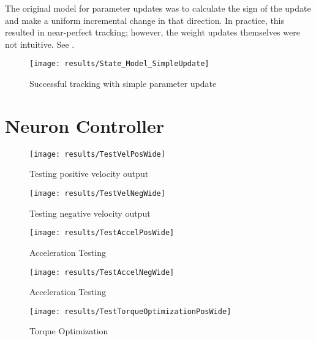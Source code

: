 
The original model for parameter updates was to calculate the sign of the update
and make a uniform incremental change in that direction. In practice, this 
resulted in near-perfect tracking; however, the weight updates themselves were
not intuitive. See .

\begin{figure}
\centering
\texttt{[image: results/State\_Model\_SimpleUpdate]}
\caption{Successful tracking with simple parameter update}
\label{fig:StateUpdateSimple}
\end{figure}

\section{Neuron Controller}




\begin{figure}
\centering
\texttt{[image: results/TestVelPosWide]}
\caption{Testing positive velocity output}
\label{fig:TestVelPos}
\end{figure}

\begin{figure}
\centering
\texttt{[image: results/TestVelNegWide]}
\caption{Testing negative velocity output}
\label{fig:TestVelNeg}
\end{figure}


\begin{figure}
\centering
\texttt{[image: results/TestAccelPosWide]}
\caption{Acceleration Testing}
\label{fig:TestAccelPos}
\end{figure}

\begin{figure}
\centering
\texttt{[image: results/TestAccelNegWide]}
\caption{Acceleration Testing}
\label{fig:TestAccelNeg}
\end{figure}

\begin{figure}
\centering
\texttt{[image: results/TestTorqueOptimizationPosWide]}
\caption{Torque Optimization}
\label{fig:TestTorqueOptimizationPos}
\end{figure}

